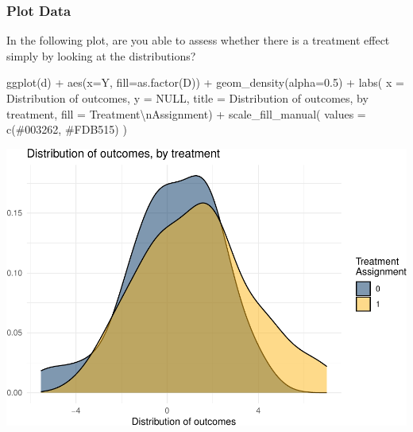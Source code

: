 \documentclass[
]{article}
\newenvironment{Shaded}{\begin{snugshade}}{\end{snugshade}}
\newcommand{\AttributeTok}[1]{\textcolor[rgb]{0.77,0.63,0.00}{#1}}
\newcommand{\ConstantTok}[1]{\textcolor[rgb]{0.00,0.00,0.00}{#1}}
\newcommand{\FloatTok}[1]{\textcolor[rgb]{0.00,0.00,0.81}{#1}}
\newcommand{\FunctionTok}[1]{\textcolor[rgb]{0.00,0.00,0.00}{#1}}
\newcommand{\NormalTok}[1]{#1}
\newcommand{\SpecialCharTok}[1]{\textcolor[rgb]{0.00,0.00,0.00}{#1}}
\newcommand{\StringTok}[1]{\textcolor[rgb]{0.31,0.60,0.02}{#1}}
\begin{document}
\hypertarget{plot-data}{%
\subsubsection{Plot Data}\label{plot-data}}

In the following plot, are you able to assess whether there is a treatment effect simply by looking at the distributions?

\begin{Shaded}
\begin{Highlighting}[]
\FunctionTok{ggplot}\NormalTok{(d) }\SpecialCharTok{+} 
  \FunctionTok{aes}\NormalTok{(}\AttributeTok{x=}\NormalTok{Y, }\AttributeTok{fill=}\FunctionTok{as.factor}\NormalTok{(D)) }\SpecialCharTok{+} 
  \FunctionTok{geom\_density}\NormalTok{(}\AttributeTok{alpha=}\FloatTok{0.5}\NormalTok{) }\SpecialCharTok{+} 
  \FunctionTok{labs}\NormalTok{(}
    \AttributeTok{x        =} \StringTok{\textquotesingle{}Distribution of outcomes\textquotesingle{}}\NormalTok{, }
    \AttributeTok{y        =} \ConstantTok{NULL}\NormalTok{, }
    \AttributeTok{title    =} \StringTok{\textquotesingle{}Distribution of outcomes, by treatment\textquotesingle{}}\NormalTok{, }
    \AttributeTok{fill    =} \StringTok{\textquotesingle{}Treatment}\SpecialCharTok{\textbackslash{}n}\StringTok{Assignment\textquotesingle{}}\NormalTok{) }\SpecialCharTok{+} 
  \FunctionTok{scale\_fill\_manual}\NormalTok{(}
    \AttributeTok{values =} \FunctionTok{c}\NormalTok{(}\StringTok{\textquotesingle{}\#003262\textquotesingle{}}\NormalTok{, }\StringTok{\textquotesingle{}\#FDB515\textquotesingle{}}\NormalTok{)}
\NormalTok{  )}
\end{Highlighting}
\end{Shaded}

\includegraphics{241-live-session_files/figure-latex/plot data-1.pdf}
\end{document}
